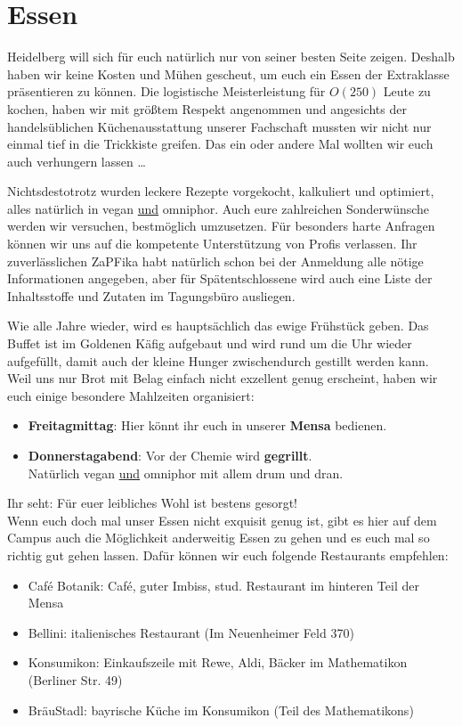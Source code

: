 
\section{Essen}
Heidelberg will sich für euch natürlich nur von seiner besten Seite zeigen. Deshalb haben wir keine Kosten und Mühen gescheut,  um euch ein Essen der Extraklasse präsentieren zu können. Die logistische Meisterleistung für $O(250)$ Leute zu kochen, haben wir mit größtem Respekt angenommen und angesichts der handelsüblichen Küchenausstattung unserer Fachschaft mussten wir nicht nur einmal tief in die Trickkiste greifen. Das ein oder andere Mal wollten wir euch auch verhungern lassen \dots

Nichtsdestotrotz wurden leckere Rezepte vorgekocht, kalkuliert und optimiert, alles natürlich in vegan \underline{und} omniphor.  Auch eure zahlreichen Sonderwünsche werden wir versuchen, bestmöglich umzusetzen. Für besonders harte Anfragen können wir uns auf die kompetente Unterstützung von Profis verlassen. Ihr zuverlässlichen ZaPFika habt natürlich schon bei der Anmeldung alle nötige Informationen angegeben, aber für Spätentschlossene wird auch eine Liste der Inhaltsstoffe und Zutaten im Tagungsbüro ausliegen.

Wie alle Jahre wieder, wird es hauptsächlich das ewige Frühstück geben. Das Buffet ist im Goldenen Käfig aufgebaut und wird rund um die Uhr wieder aufgefüllt, damit auch der kleine  Hunger zwischendurch gestillt werden kann. Weil uns nur Brot mit Belag einfach nicht exzellent genug erscheint, haben wir euch einige besondere Mahlzeiten organisiert:
  \begin{itemize}
    \item \textbf{Freitagmittag}: Hier könnt ihr euch in unserer \textbf{Mensa} bedienen.
    \item \textbf{Donnerstagabend}: Vor der Chemie wird \textbf{gegrillt}. \\
      Natürlich vegan \underline{und} omniphor mit allem drum und dran.
  \end{itemize}
  Ihr seht: Für euer leibliches Wohl ist bestens gesorgt! \\

  Wenn euch doch mal unser Essen nicht exquisit genug ist, gibt es hier auf dem Campus auch die Möglichkeit
  anderweitig Essen zu gehen und es euch mal so richtig gut gehen lassen. Dafür können wir euch
  folgende Restaurants empfehlen:
  \begin{itemize}
  \item Café Botanik: Café, guter Imbiss, stud. Restaurant im hinteren Teil der Mensa
  \item Bellini: italienisches Restaurant (Im Neuenheimer Feld 370)
  \item Konsumikon: Einkaufszeile mit Rewe, Aldi, Bäcker im Mathematikon (Berliner Str. 49)
  \item BräuStadl: bayrische Küche im Konsumikon (Teil des Mathematikons)
  \end{itemize}
